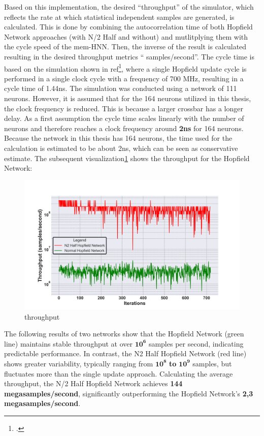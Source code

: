 Based on this implementation, the desired ``throughput'' of the simulator, which reflects the rate at which statistical independent samples are generated, is calculated.
This is done by combining the autocorrelation time of both Hopfield Network approaches (with N/2 Half and without) and mutlitplying them with the cycle speed of the \ac{mem-HNN}.
Then, the inverse of the result is calculated resulting in the desired throughput metrics `` samples/second''.
The cycle time is based on the simulation shown in ref\footcite[cf.][4]{hizzaniMemristorbasedHardwareAlgorithms2023}, where a single Hopfield update cycle is performed in a single clock cycle with a frequency of 700 MHz, resulting in a cycle time of 1.44ns.
The simulation was conducted using a network of 111 neurons.
However, it is assumed that for the 164 neurons utilized in this thesis, the clock frequency is reduced.
This is because a larger crossbar has a longer delay.
As a first assumption the cycle time scales linearly with the number of neurons and therefore reaches a clock frequency around \textbf{2ns} for 164 neurons.
Because the network in this thesis has 164 neurons, the time used for the calculation is estimated to be about 2ns, which can be seen as conservative estimate.
The subsequent visualization\ref{Throughput comparison} shows the throughput for the Hopfield Network:
\begin{figure}[H]
    \centering
    \includegraphics[width=0.7\linewidth]{graphics/Visualisierungen_throughput_log_2.png}
    \caption{throughput}
    \label{Throughput comparison}
\end{figure}
The following results of two networks show that the Hopfield Network (green line) maintains stable throughput at over \(\mathbf{10^6}\) samples per second, indicating predictable performance.
In contrast, the N2 Half Hopfield Network (red line) shows greater variability, typically ranging from \(\mathbf{10^8}\) \textbf{to} \(\mathbf{10^9}\) samples, but fluctuates more than the single update approach.
Calculating the average throughput, the N/2 Half Hopfield Network achieves \textbf{144 megasamples/second}, significantly outperforming the Hopfield Network's \textbf{2,3 megasamples/second}.
